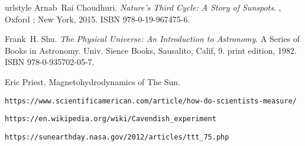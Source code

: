 \documentclass{../template/texnote}
\begin{document}
\begin{thebibliography}{4}
\providecommand{\natexlab}[1]{#1}
\providecommand{\url}[1]{\texttt{#1}}
\expandafter\ifx\csname urlstyle\endcsname\relax
  \providecommand{\doi}[1]{doi: #1}\else
  \providecommand{\doi}{doi: \begingroup \urlstyle{rm}\Url}\fi
{}
Arnab~Rai Choudhuri.
\newblock \emph{Nature's Third Cycle: A Story of Sunspots}.
, {Oxford ; New York}, 2015.
\newblock ISBN 978-0-19-967475-6.

Frank~H. Shu.
\newblock \emph{The Physical Universe: An Introduction to Astronomy}.
\newblock A Series of Books in Astronomy. {Univ. Sience Books}, {Sausalito,
  Calif}, 9. print edition, 1982.
\newblock ISBN 978-0-935702-05-7.

Eric Priest.
\newblock Magnetohydrodynamics of {{The Sun}}.

\url{https://www.scientificamerican.com/article/how-do-scientists-measure/}

\url{https://en.wikipedia.org/wiki/Cavendish_experiment}

\url{https://sunearthday.nasa.gov/2012/articles/ttt_75.php}

\end{thebibliography}
\vspace{0.5cm}
\noindent{}
    \printbibliography
\end{document}
